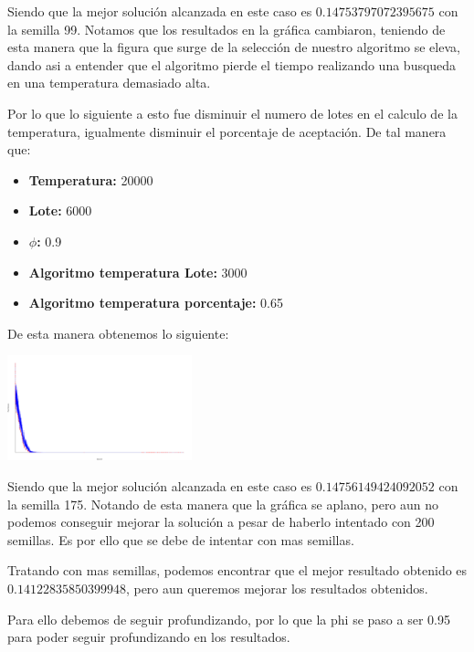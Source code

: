 \begin{multicols}{2}
Siendo que la mejor solución alcanzada en este caso es $0.14753797072395675$ con la semilla 99. Notamos que los resultados en la gráfica cambiaron, teniendo de esta manera que la figura que surge de la selección de nuestro algoritmo se eleva, dando asi a entender que el algoritmo pierde el tiempo realizando una busqueda en una temperatura demasiado alta.

Por lo que lo siguiente a esto fue disminuir el numero de lotes en el calculo de la temperatura, igualmente disminuir el porcentaje de aceptación. De tal manera que:

\begin{itemize}
\item \textbf{Temperatura:} 20000
\item \textbf{Lote: } 6000
\item \textbf{$\phi$: } 0.9
\item \textbf{Algoritmo temperatura Lote: } 3000
\item \textbf{Algoritmo temperatura porcentaje: } 0.65
\end{itemize}

De esta manera obtenemos lo siguiente:

\begin{center}
    \includegraphics[width=0.4\textwidth]{../svgs/150_documentable_semilla_175.pdf}
\end{center}

Siendo que la mejor solución alcanzada en este caso es $0.14756149424092052$ con la semilla 175. Notando de esta manera que la gráfica se aplano, pero aun no podemos conseguir mejorar la solución a pesar de haberlo intentado con 200 semillas. Es por ello que se debe de intentar con mas semillas.

Tratando con mas semillas, podemos encontrar que el mejor resultado obtenido es $0.14122835850399948$, pero aun queremos mejorar los resultados obtenidos.

Para ello debemos de seguir profundizando, por lo que la phi se paso a ser 0.95 para poder seguir profundizando en los resultados.


\end{multicols}
